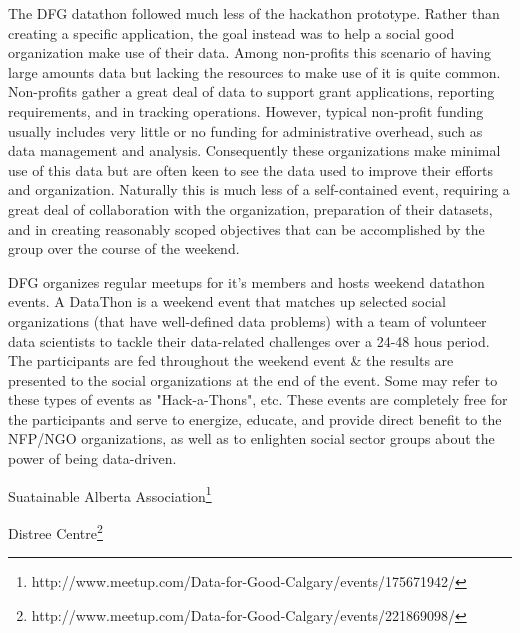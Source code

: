 The DFG datathon followed much less of the hackathon prototype.  Rather than creating a specific application, the goal instead was to help a social good organization make use of their data.  Among non-profits this scenario of having large amounts data but lacking the resources to make use of it is quite common.  Non-profits gather a great deal of data to support grant applications, reporting requirements, and in tracking operations.  However, typical non-profit funding usually includes very little or no funding for administrative overhead, such as data management and analysis.  Consequently these organizations make minimal use of this data but are often keen to see the data used to improve their efforts and organization.  
Naturally this is much less of a self-contained event, requiring a great deal of collaboration with the organization, preparation of their datasets, and in creating reasonably scoped objectives that can be accomplished by the group over the course of the weekend.


DFG organizes regular meetups for it's members and hosts weekend datathon events. A DataThon is a weekend event that matches up selected social organizations (that have well-defined data problems) with a team of volunteer data scientists to tackle their data-related challenges over a 24-48 hous period. The participants are fed throughout the weekend event \& the results are presented to the social organizations at the end of the event. Some may refer to these types of events as "Hack-a-Thons", etc. These events are completely free for the participants and serve to energize, educate, and provide direct benefit to the NFP/NGO organizations, as well as to enlighten social sector groups about the power of being data-driven.


Suatainable Alberta Association\footnote{http://www.meetup.com/Data-for-Good-Calgary/events/175671942/}

Distree Centre\footnote{http://www.meetup.com/Data-for-Good-Calgary/events/221869098/}


